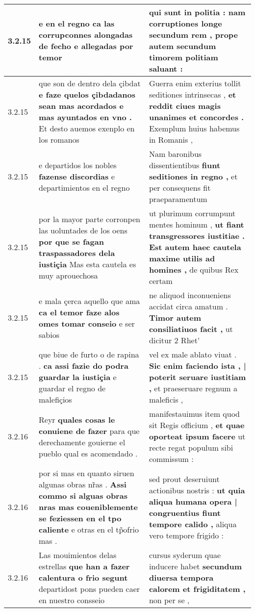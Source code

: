 \begin{tabular}{|p{1cm}|p{6.5cm}|p{6.5cm}|}
3.2.15 & e en el regno \textbf{ ca las corrupconnes alongadas de fecho } e allegadas por temor & qui sunt in politia : \textbf{ nam corruptiones longe secundum rem , } prope autem secundum timorem politiam saluant : \\\hline
3.2.15 & que son de dentro dela çibdat \textbf{ e faze quelos çibdadanos sean mas acordados e mas ayuntados en vno . } Et desto auemos exenplo en los romanos & Guerra enim exterius tollit seditiones intrinsecas , \textbf{ et reddit ciues magis unanimes et concordes . } Exemplum huius habemus in Romanis , \\\hline
3.2.15 & e departidos los nobles \textbf{ fazense discordias } e departimientos en el regno & Nam baronibus dissentientibus \textbf{ fiunt seditiones in regno , } et per consequens fit praeparamentum \\\hline
3.2.15 & por la mayor parte corronpen las uoluntades de los oens \textbf{ por que se fagan traspassadores dela iustiçia } Mas esta cautela es muy aprouechosa & ut plurimum corrumpunt mentes hominum , \textbf{ ut fiant transgressores iustitiae . Est autem haec cautela maxime utilis ad homines , } de quibus Rex certam \\\hline
3.2.15 & e mala çerca aquello que ama \textbf{ ca el temor faze alos omes tomar conseio } e ser sabios & ne aliquod inconueniens accidat circa amatum . \textbf{ Timor autem consiliatiuos facit , } ut dicitur 2 Rhet’ \\\hline
3.2.15 & que biue de furto o de rapina . \textbf{ ca assi fazie do podra guardar la iustiçia } e guardar el regno de malefiçios & vel ex male ablato viuat . \textbf{ Sic enim faciendo ista , | poterit seruare iustitiam , } et praeseruare regnum a maleficis , \\\hline
3.2.16 & Reyr \textbf{ quales cosas le conuiene de fazer } para que derechamente gouierne el pueblo qual es acomendado . & manifestauimus item quod sit Regis officium , \textbf{ et quae oporteat ipsum facere } ut recte regat populum sibi commissum : \\\hline
3.2.16 & por si mas en quanto siruen algunas obras nr̃as . \textbf{ Assi commo si alguas obras nras mas coueniblemente se feziessen en el tpo caliente } e otras en el tp̃ofrio mas . & sed prout deseruiunt actionibus nostris : \textbf{ ut quia aliqua humana opera | congruentius fiunt tempore calido , } aliqua vero tempore frigido : \\\hline
3.2.16 & Las mouimientos delas estrellas \textbf{ que han a fazer calentura o frio segunt } departidost pons pueden caer en nuestro consseio & cursus syderum quae inducere habet \textbf{ secundum diuersa tempora calorem et frigiditatem , } non per se , \\\hline

\end{tabular}
